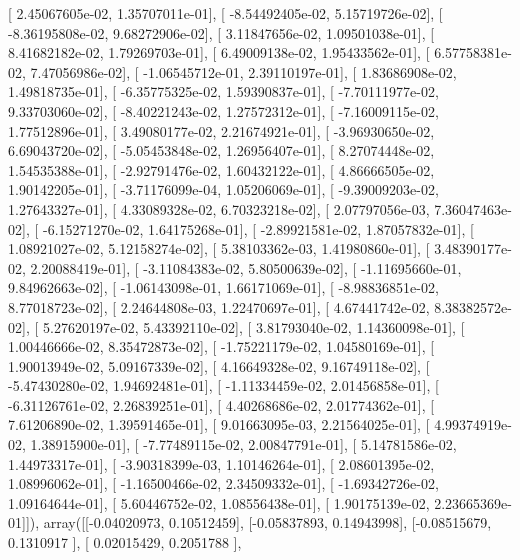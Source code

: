 \documentclass{article}
\begin{document}
       [  2.45067605e-02,   1.35707011e-01],
       [ -8.54492405e-02,   5.15719726e-02],
       [ -8.36195808e-02,   9.68272906e-02],
       [  3.11847656e-02,   1.09501038e-01],
       [  8.41682182e-02,   1.79269703e-01],
       [  6.49009138e-02,   1.95433562e-01],
       [  6.57758381e-02,   7.47056986e-02],
       [ -1.06545712e-01,   2.39110197e-01],
       [  1.83686908e-02,   1.49818735e-01],
       [ -6.35775325e-02,   1.59390837e-01],
       [ -7.70111977e-02,   9.33703060e-02],
       [ -8.40221243e-02,   1.27572312e-01],
       [ -7.16009115e-02,   1.77512896e-01],
       [  3.49080177e-02,   2.21674921e-01],
       [ -3.96930650e-02,   6.69043720e-02],
       [ -5.05453848e-02,   1.26956407e-01],
       [  8.27074448e-02,   1.54535388e-01],
       [ -2.92791476e-02,   1.60432122e-01],
       [  4.86666505e-02,   1.90142205e-01],
       [ -3.71176099e-04,   1.05206069e-01],
       [ -9.39009203e-02,   1.27643327e-01],
       [  4.33089328e-02,   6.70323218e-02],
       [  2.07797056e-03,   7.36047463e-02],
       [ -6.15271270e-02,   1.64175268e-01],
       [ -2.89921581e-02,   1.87057832e-01],
       [  1.08921027e-02,   5.12158274e-02],
       [  5.38103362e-03,   1.41980860e-01],
       [  3.48390177e-02,   2.20088419e-01],
       [ -3.11084383e-02,   5.80500639e-02],
       [ -1.11695660e-01,   9.84962663e-02],
       [ -1.06143098e-01,   1.66171069e-01],
       [ -8.98836851e-02,   8.77018723e-02],
       [  2.24644808e-03,   1.22470697e-01],
       [  4.67441742e-02,   8.38382572e-02],
       [  5.27620197e-02,   5.43392110e-02],
       [  3.81793040e-02,   1.14360098e-01],
       [  1.00446666e-02,   8.35472873e-02],
       [ -1.75221179e-02,   1.04580169e-01],
       [  1.90013949e-02,   5.09167339e-02],
       [  4.16649328e-02,   9.16749118e-02],
       [ -5.47430280e-02,   1.94692481e-01],
       [ -1.11334459e-02,   2.01456858e-01],
       [ -6.31126761e-02,   2.26839251e-01],
       [  4.40268686e-02,   2.01774362e-01],
       [  7.61206890e-02,   1.39591465e-01],
       [  9.01663095e-03,   2.21564025e-01],
       [  4.99374919e-02,   1.38915900e-01],
       [ -7.77489115e-02,   2.00847791e-01],
       [  5.14781586e-02,   1.44973317e-01],
       [ -3.90318399e-03,   1.10146264e-01],
       [  2.08601395e-02,   1.08996062e-01],
       [ -1.16500466e-02,   2.34509332e-01],
       [ -1.69342726e-02,   1.09164644e-01],
       [  5.60446752e-02,   1.08556438e-01],
       [  1.90175139e-02,   2.23665369e-01]]), array([[-0.04020973,  0.10512459],
       [-0.05837893,  0.14943998],
       [-0.08515679,  0.1310917 ],
       [ 0.02015429,  0.2051788 ],
\end{document}
